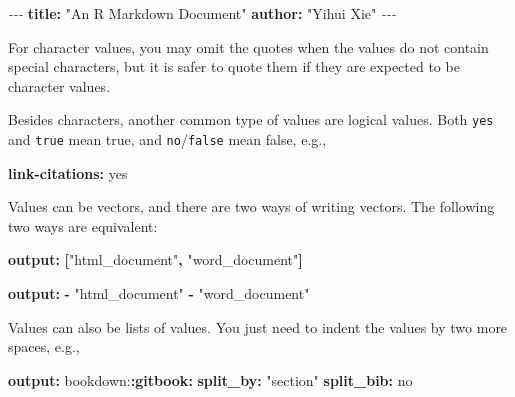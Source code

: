 \documentclass[
  12pt,
]{krantz}
\newenvironment{Shaded}{\begin{snugshade}}{\end{snugshade}}
\newcommand{\AttributeTok}[1]{\textcolor[rgb]{0.13,0.29,0.53}{#1}}
\newcommand{\CharTok}[1]{\textcolor[rgb]{0.31,0.60,0.02}{#1}}
\newcommand{\FunctionTok}[1]{\textcolor[rgb]{0.13,0.29,0.53}{\textbf{#1}}}
\newcommand{\KeywordTok}[1]{\textcolor[rgb]{0.13,0.29,0.53}{\textbf{#1}}}
\newcommand{\PreprocessorTok}[1]{\textcolor[rgb]{0.56,0.35,0.01}{\textit{#1}}}
\newcommand{\StringTok}[1]{\textcolor[rgb]{0.31,0.60,0.02}{#1}}
\theoremstyle{definition}
\theoremstyle{definition}
\theoremstyle{definition}
\theoremstyle{definition}
\theoremstyle{remark}
\begin{document}
\begin{Shaded}
\begin{Highlighting}[]
\PreprocessorTok{{-}{-}{-}}
\FunctionTok{title}\KeywordTok{:}\AttributeTok{ }\StringTok{"An R Markdown Document"}
\FunctionTok{author}\KeywordTok{:}\AttributeTok{ }\StringTok{"Yihui Xie"}
\PreprocessorTok{{-}{-}{-}}
\end{Highlighting}
\end{Shaded}

For character values, you may omit the quotes when the values do not contain special characters, but it is safer to quote them if they are expected to be character values.

Besides characters, another common type of values are logical values. Both \texttt{yes} and \texttt{true} mean true, and \texttt{no}/\texttt{false} mean false, e.g.,

\begin{Shaded}
\begin{Highlighting}[]
\FunctionTok{link{-}citations}\KeywordTok{:}\AttributeTok{ }\CharTok{yes}
\end{Highlighting}
\end{Shaded}

Values can be vectors, and there are two ways of writing vectors. The following two ways are equivalent:

\begin{Shaded}
\begin{Highlighting}[]
\FunctionTok{output}\KeywordTok{:}\AttributeTok{ }\KeywordTok{[}\StringTok{"html\_document"}\KeywordTok{,}\AttributeTok{ }\StringTok{"word\_document"}\KeywordTok{]}
\end{Highlighting}
\end{Shaded}

\begin{Shaded}
\begin{Highlighting}[]
\FunctionTok{output}\KeywordTok{:}
\AttributeTok{  }\KeywordTok{{-}}\AttributeTok{ }\StringTok{"html\_document"}
\AttributeTok{  }\KeywordTok{{-}}\AttributeTok{ }\StringTok{"word\_document"}
\end{Highlighting}
\end{Shaded}

Values can also be lists of values. You just need to indent the values by two more spaces, e.g.,

\begin{Shaded}
\begin{Highlighting}[]
\FunctionTok{output}\KeywordTok{:}
\AttributeTok{  bookdown:}\FunctionTok{:gitbook}\KeywordTok{:}
\AttributeTok{    }\FunctionTok{split\_by}\KeywordTok{:}\AttributeTok{ }\StringTok{"section"}
\AttributeTok{    }\FunctionTok{split\_bib}\KeywordTok{:}\AttributeTok{ }\CharTok{no}
\end{Highlighting}
\end{Shaded}
\end{document}
